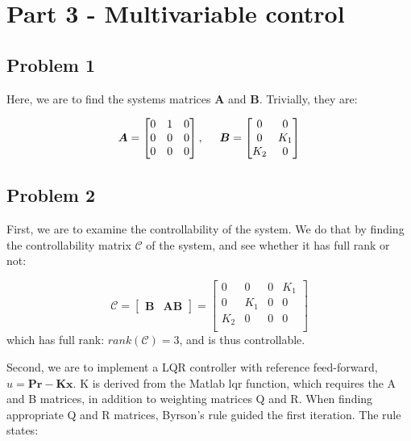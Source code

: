 \section{Part 3 - Multivariable control}
\subsection{Problem 1}
Here, we are to find the systems matrices $\boldsymbol{A}$ and
$\boldsymbol{B}$. Trivially, they are:

\begin{equation}
  \boldsymbol{A} = \begin{bmatrix}
    0 & 1 & 0 \\
    0 & 0 & 0 \\
    0 & 0 & 0 \\
  \end{bmatrix}, \hspace{0.5cm}
  \boldsymbol{B} = \begin{bmatrix}
    0 & 0 \\
    0 & K_1 \\
    K_2 & 0 \\
  \end{bmatrix}
\end{equation}

\subsection{Problem 2}
First, we are to examine the controllability of the system. We do that
by finding the controllability matrix $\boldsymbol{\mathcal{C}}$ of
the system, and see whether it has full rank or not:

\begin{equation}
  \boldsymbol{\mathcal{C}} = \begin{bmatrix}
    \boldsymbol{B} & \boldsymbol{AB}
  \end{bmatrix}
  =
  \begin{bmatrix}
    0 & 0 & 0 & K_1 \\
    0 & K_1 & 0 & 0 \\
    K_2 & 0 & 0 & 0 \\
  \end{bmatrix}
\end{equation}
which has full rank: $rank(\bm{\mathcal{C}}) = 3$, and is thus
controllable.

Second, we are to implement a LQR controller with reference
feed-forward, $u = \bm{Pr}-\bm{Kx}$. K is derived from the Matlab lqr
function, which requires the A and B matrices, in addition to
weighting matrices Q and R. When finding appropriate Q and R matrices,
Byrson's rule guided the first iteration. The rule states:

